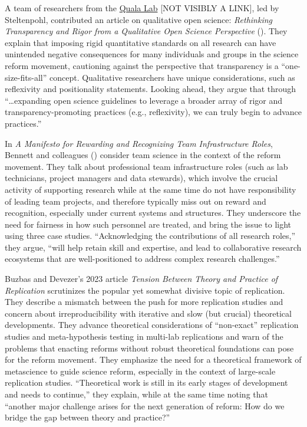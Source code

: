 \documentclass[authordate, editorial,noabstract]{jote-new-article}
\begin{document}
A team of researchers from the \href{https://qualalab.org/}{Quala Lab} [NOT VISIBLY A LINK], led by Steltenpohl, contributed an article on qualitative open science: \emph{Rethinking Transparency and Rigor from a Qualitative Open Science Perspective} (\hspace*{-2pt}\citeyear{Steltenpohl2023}). They explain that imposing rigid quantitative standards on all research can have unintended negative consequences for many individuals and groups in the science reform movement, cautioning against the perspective that transparency is a “one-size-fits-all” concept. Qualitative researchers have unique considerations, such as reflexivity and positionality statements. Looking ahead, they argue that through “…expanding open science guidelines to leverage a broader array of rigor and transparency-promoting practices (e.g., reflexivity), we can truly begin to advance practices.”



In \emph{A Manifesto for Rewarding and Recognizing Team Infrastructure Roles}, Bennett and colleagues (\hspace*{-2pt}\citeyear{Bennett2023}) consider team science in the context of the reform movement. They talk about professional team infrastructure roles (such as lab technicians, project managers and data stewards), which involve the crucial activity of supporting research while at the same time do not have responsibility of leading team projects, and therefore typically miss out on reward and recognition, especially under current systems and structures. They underscore the need for fairness in how such personnel are treated, and bring the issue to light using three case studies. “Acknowledging the contributions of all research roles,” they argue, “will help retain skill and expertise, and lead to collaborative research ecosystems that are well-positioned to address complex research challenges.”



Buzbas and Devezer's 2023 article \emph{Tension Between Theory and Practice of Replication} scrutinizes the popular yet somewhat divisive topic of replication. They describe a mismatch between the push for more replication studies and concern about irreproducibility with iterative and slow (but crucial) theoretical developments. They advance theoretical considerations of “non-exact” replication studies and meta-hypothesis testing in multi-lab replications and warn of the problems that enacting reforms without robust theoretical foundations can pose for the reform movement. They emphasize the need for a theoretical framework of metascience to guide science reform, especially in the context of large-scale replication studies. “Theoretical work is still in its early stages of development and needs to continue,” they explain, while at the same time noting that “another major challenge arises for the next generation of reform: How do we bridge the gap between theory and practice?”
\end{document}
